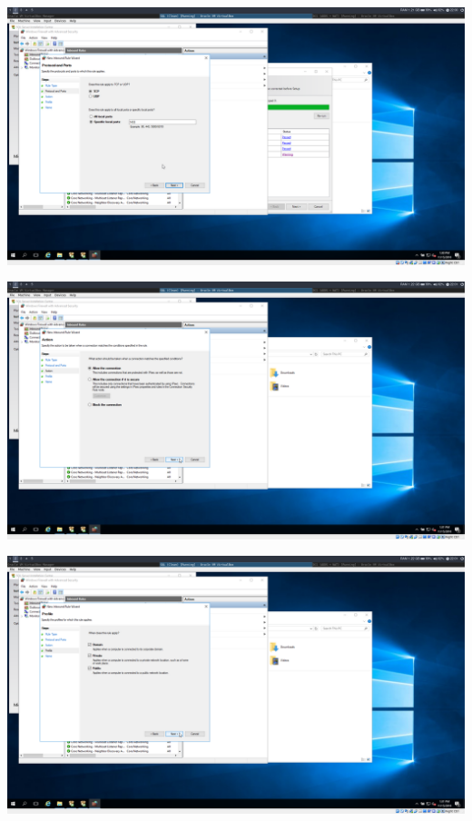 \documentclass[a4paper]{article}
\begin{document}
\begin{center}
	\includegraphics[width=15cm]{Pictures/SQL/1542315658.png}
\end{center}
\begin{center}
	\includegraphics[width=15cm]{Pictures/SQL/1542315671.png}
\end{center}
\begin{center}
	\includegraphics[width=15cm]{Pictures/SQL/1542315673.png}
\end{center}
\end{document}
